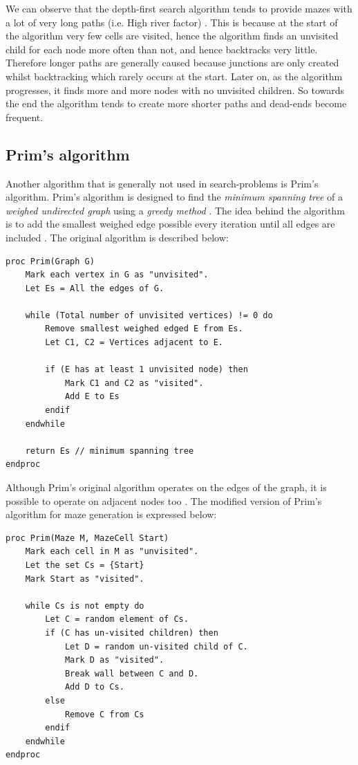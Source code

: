 We can observe that the depth-first search algorithm tends to provide mazes with a lot of very long paths (i.e. High river factor) \citep{ThinkLabyrinth}. This is because at the start of the algorithm very few cells are visited, hence the algorithm finds an unvisited child for each node more often than not, and hence backtracks very little. Therefore longer paths are generally caused because junctions are only created whilst backtracking which rarely occurs at the start. Later on, as the algorithm progresses, it finds more and more nodes with no unvisited children. So towards the end the algorithm tends to create more shorter paths and dead-ends become frequent.

\subsection{Prim's algorithm}
Another algorithm that is generally not used in search-problems is Prim's algorithm. Prim's algorithm is designed to find the {\em minimum spanning tree} of a {\em weighed undirected graph} using a {\em greedy method} \citep{Prim}. The idea behind the algorithm is to add the smallest weighed edge possible every iteration until all edges are included \citep{Prim}. The original algorithm is described below:

\lstAlgo
\begin{lstlisting}
proc Prim(Graph G)
	Mark each vertex in G as "unvisited".
	Let Es = All the edges of G.

	while (Total number of unvisited vertices) != 0 do
		Remove smallest weighed edged E from Es.
		Let C1, C2 = Vertices adjacent to E.
		
		if (E has at least 1 unvisited node) then
			Mark C1 and C2 as "visited".
			Add E to Es
		endif
	endwhile
	
	return Es // minimum spanning tree
endproc
\end{lstlisting}

Although Prim's original algorithm operates on the edges of the graph, it is possible to operate on adjacent nodes too \citep{DSAJ-4}. The modified version of Prim's algorithm for maze generation is expressed below:

\lstAlgo
\begin{lstlisting}
proc Prim(Maze M, MazeCell Start)
	Mark each cell in M as "unvisited".
	Let the set Cs = {Start}
	Mark Start as "visited".

	while Cs is not empty do
		Let C = random element of Cs.
		if (C has un-visited children) then	
			Let D = random un-visited child of C.
			Mark D as "visited".
			Break wall between C and D.
			Add D to Cs.
		else
			Remove C from Cs
		endif
	endwhile
endproc
\end{lstlisting}

